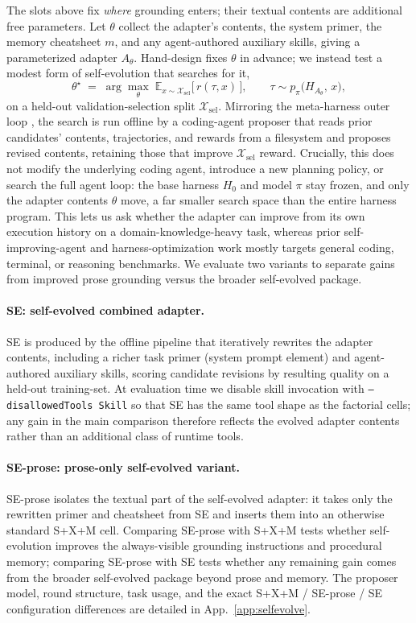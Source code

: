 \documentclass{article}
\begin{document}
The slots above fix \emph{where} grounding enters; their textual contents are additional free parameters. Let $\theta$ collect the adapter's contents, the system primer, the memory cheatsheet $m$, and any agent-authored auxiliary skills, giving a parameterized adapter $A_\theta$. Hand-design fixes $\theta$ in advance; we instead test a modest form of self-evolution that searches for it,
\begin{equation}
\theta^\star \;=\; \arg\max_{\theta}\; \mathbb{E}_{x\sim\mathcal{X}_{\mathrm{sel}}}\big[\,r(\tau,x)\,\big], \qquad \tau \sim p_\pi\big(H_{A_\theta},\, x\big),
\label{eq:selfevolve}
\end{equation}
on a held-out validation-selection split $\mathcal{X}_{\mathrm{sel}}$. Mirroring the meta-harness outer loop \citep{lee2026metaharness}, the search is run offline by a coding-agent proposer that reads prior candidates' contents, trajectories, and rewards from a filesystem and proposes revised contents, retaining those that improve $\mathcal{X}_{\mathrm{sel}}$ reward. Crucially, this does not modify the underlying coding agent, introduce a new planning policy, or search the full agent loop: the base harness $H_0$ and model $\pi$ stay frozen, and only the adapter contents $\theta$ move, a far smaller search space than the entire harness program. This lets us ask whether the adapter can improve from its own execution history on a domain-knowledge-heavy task, whereas prior self-improving-agent and harness-optimization work mostly targets general coding, terminal, or reasoning benchmarks. We evaluate two variants to separate gains from improved prose grounding versus the broader self-evolved package.

\paragraph{SE: self-evolved combined adapter.} SE is produced by the offline pipeline that iteratively rewrites the adapter contents, including a richer task primer (system prompt element) and agent-authored auxiliary skills, scoring candidate revisions by resulting quality on a held-out training-set. At evaluation time we disable skill invocation with \texttt{--disallowedTools Skill} so that SE has the same tool shape as the factorial cells; any gain in the main comparison therefore reflects the evolved adapter contents rather than an additional class of runtime tools.

\paragraph{SE-prose: prose-only self-evolved variant.} SE-prose isolates the textual part of the self-evolved adapter: it takes only the rewritten primer and cheatsheet from SE and inserts them into an otherwise standard S+X+M cell. Comparing SE-prose with S+X+M tests whether self-evolution improves the always-visible grounding instructions and procedural memory; comparing SE-prose with SE tests whether any remaining gain comes from the broader self-evolved package beyond prose and memory. The proposer model, round structure, task usage, and the exact S+X+M / SE-prose / SE configuration differences are detailed in App.~\ref{app:selfevolve}.
\end{document}
